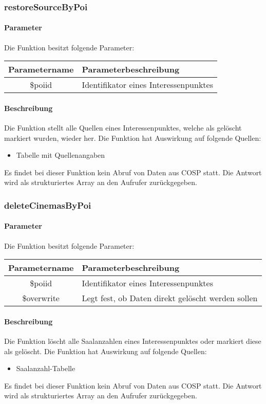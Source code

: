 \subsubsection{restoreSourceByPoi}
\paragraph{Parameter} Die Funktion besitzt folgende Parameter:
\begin{table}[H]
	\begin{tabular}{|c|p{11cm}|}
		\hline
		\textbf{Parametername} & \textbf{Parameterbeschreibung} \\ \hline
		\$poiid     & Identifikator eines Interessenpunktes \\ \hline
	\end{tabular}
\end{table}
\paragraph{Beschreibung} Die Funktion stellt alle Quellen eines Interessenpunktes, welche als gelöscht markiert wurden, wieder her. Die Funktion hat Auswirkung auf folgende Quellen:
\begin{itemize}
	\item Tabelle mit Quellenangaben
\end{itemize}
Es findet bei dieser Funktion kein Abruf von Daten aus {\glqq COSP\grqq} statt. Die Antwort wird als strukturiertes Array an den Aufrufer zurückgegeben.
\subsubsection{deleteCinemasByPoi}
\paragraph{Parameter} Die Funktion besitzt folgende Parameter:
\begin{table}[H]
	\begin{tabular}{|c|p{11cm}|}
		\hline
		\textbf{Parametername} & \textbf{Parameterbeschreibung} \\ \hline
		\$poiid     & Identifikator eines Interessenpunktes \\ \hline
		\$overwrite & Legt fest, ob Daten direkt gelöscht werden sollen \\ \hline
	\end{tabular}
\end{table}
\paragraph{Beschreibung} Die Funktion löscht alle Saalanzahlen eines Interessenpunktes oder markiert diese als gelöscht. Die Funktion hat Auswirkung auf folgende Quellen:
\begin{itemize}
	\item Saalanzahl-Tabelle
\end{itemize}
Es findet bei dieser Funktion kein Abruf von Daten aus {\glqq COSP\grqq} statt. Die Antwort wird als strukturiertes Array an den Aufrufer zurückgegeben.
